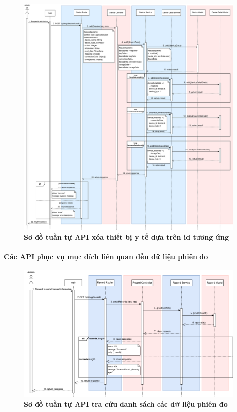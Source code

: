 \begin{figure}[H]
	\centering
	\includegraphics[width=16cm]{Images/api_sequence/device/device-Add.drawio.png}
	\caption[Sơ đồ tuần tự API xóa thiết bị y tế dựa trên id tương ứng]{\bfseries \fontsize{12pt}{0pt}\selectfont Sơ đồ tuần tự API xóa thiết bị y tế dựa trên id tương ứng}
	\label{sequence_diagram_get_device_by_id}
\end{figure}
\paragraph{Các API phục vụ mục đích liên quan đến dữ liệu phiên đo}
\mbox{}
\begin{figure}[H]
	\centering
	\includegraphics[width=16cm]{Images/api_sequence/record/getAllRecord.drawio.png}
	\caption[Sơ đồ tuần tự API tra cứu danh sách các dữ liệu phiên đo]{\bfseries \fontsize{12pt}{0pt}\selectfont Sơ đồ tuần tự API tra cứu danh sách các dữ liệu phiên đo}
	\label{sequence_diagram_get_all_records}
\end{figure}

